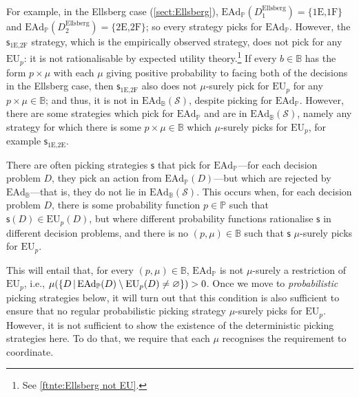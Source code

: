 \documentclass[a4paper]{article}
\renewcommand\P{\mathbb{P}} %
\newcommand\EU{\mathrm{EU}}
\newcommand\EAd{\mathrm{EAd}}
\renewcommand\S{\mathcal{S}}
\newcommand\s{\mathsf{s}}
\newcommand{\IB}{\mathbb{B}}
\newcommand{\IP}{\P}
\renewcommand{\color}[1]{}
\newenvironment{colored}[1]{\leavevmode\color{#1}}{}
\newcommand{\Strategies}{\S}
\newcommand\SetDelimiter[1][]{
	\nonscript\,#1\vert \allowbreak \nonscript\,\mathopen{}}
\providecommand\given{\SetDelimiter}
\renewcommand{\emptyset}{\varnothing}
\newenvironment{CCM rewritten}
{\begingroup\color{blue}} %
{\endgroup}              %
\begin{document}
For example, in the Ellsberg case (\cref{sect:Ellsberg}), $\EAd_\IP(D^{\mathrm{Ellsberg}}_1)=\{\text{1E,1F}\}$ and $\EAd_\IP(D^{\mathrm{Ellsberg}}_2)=\{\text{2E,2F}\}$; so every strategy picks for $\EAd_\IP$. 
However, the $\s_{\text{1E,2F}}$ strategy, which is the empirically observed strategy, does not pick for any $\EU_p$: it is not rationalisable by expected utility theory.\footnote{See \cref{ftnte:Ellsberg not EU}.} 
If every $b\in\IB$ has the form $p\times\mu$ with each $\mu$ giving positive probability to facing both of the decisions in the Ellsberg case, then $\s_{\text{1E,2F}}$ also does not $\mu$-surely pick for $\EU_p$ for any $p\times\mu\in\IB$; and thus, it is not in $\EAd_\IB(\S)$, despite picking for $\EAd_\IP$. 
However, there are some strategies which pick for $\EAd_\IP$ and are in $\EAd_\IB(\S)$, namely any strategy for which there is some $p\times\mu\in\IB$ which $\mu$-surely picks for $\EU_p$, for example $\s_{\text{1E,2E}}$. 


	
There are often picking strategies $\s$ that pick for $\EAd_\IP$---for each decision problem $D$, they pick an action from $\EAd_\IP(D)$---but which are rejected by $\EAd_\IB$---that is, they do not lie in $\EAd_\IB(\Strategies)$. 
This occurs when, for each decision problem $D$, there is some probability function $p\in\IP$ such that $\s(D)\in\EU_p(D)$, but where different probability functions rationalise $\s$ in different decision problems, and there is no $(p,\mu)\in\IB$ such that $\s$ $\mu$-surely picks for $\EU_p$. 

This will entail that, for every $(p,\mu)\in\IB$, $\EAd_\IP$ is not $\mu$-surely a restriction of $\EU_p$, i.e., $\mu(\{D\given \EAd_\IP(D)\setminus\EU_p(D)\neq\emptyset\})>0$. Once we move to \emph{probabilistic} picking strategies below, it will turn out that this condition is also sufficient to ensure that no regular probabilistic picking strategy $\mu$-surely picks for $\EU_p$. However, it is not sufficient to show the existence of the deterministic picking strategies here. To do that, we require that each $\mu$ recognises the requirement to coordinate. 
\end{document}
